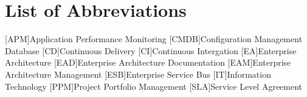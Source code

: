 
\chapter*{List of Abbreviations}

\begin{acronym}[ewuifbwejkbfjksbjkcbsdjcjkn3j]%
[APM]{Application Performance Monitoring}
[CMDB]{Configuration Management Database}
[CD]{Continuous Delivery}
[CI]{Continuous Intergation}
[EA]{Enterprise Architecture}
[EAD]{Enterprise Architecture Documentation}
[EAM]{Enterprise Architecture Management}
[ESB]{Enterprise Service Bus}
[IT]{Information Technology}
[PPM]{Project Portfolio Management}
[SLA]{Service Level Agreement}

%


\end{acronym}